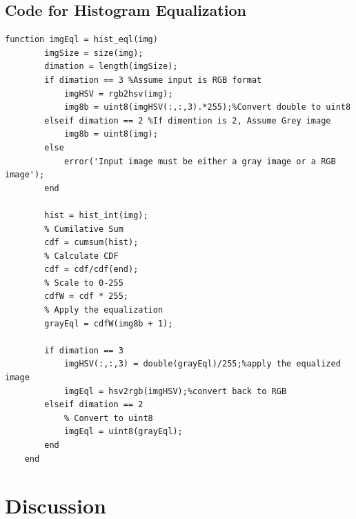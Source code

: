 \documentclass[a4paper,11pt]{article}
\begin{document}
\subsection{Code for Histogram Equalization}
\lstset{language = Matlab}
    \begin{lstlisting}[basicstyle=\tiny]
    function imgEql = hist_eql(img)
        imgSize = size(img);
        dimation = length(imgSize);
        if dimation == 3 %Assume input is RGB format
            imgHSV = rgb2hsv(img);
            img8b = uint8(imgHSV(:,:,3).*255);%Convert double to uint8
        elseif dimation == 2 %If dimention is 2, Assume Grey image
            img8b = uint8(img);
        else
            error('Input image must be either a gray image or a RGB image');
        end
    
        hist = hist_int(img);
        % Cumilative Sum
        cdf = cumsum(hist);
        % Calculate CDF
        cdf = cdf/cdf(end);
        % Scale to 0-255
        cdfW = cdf * 255;
        % Apply the equalization
        grayEql = cdfW(img8b + 1);
        
        if dimation == 3
            imgHSV(:,:,3) = double(grayEql)/255;%apply the equalized image
            imgEql = hsv2rgb(imgHSV);%convert back to RGB
        elseif dimation == 2
            % Convert to uint8
            imgEql = uint8(grayEql);
        end
    end
\end{lstlisting}

\section{Discussion}
\end{document}
